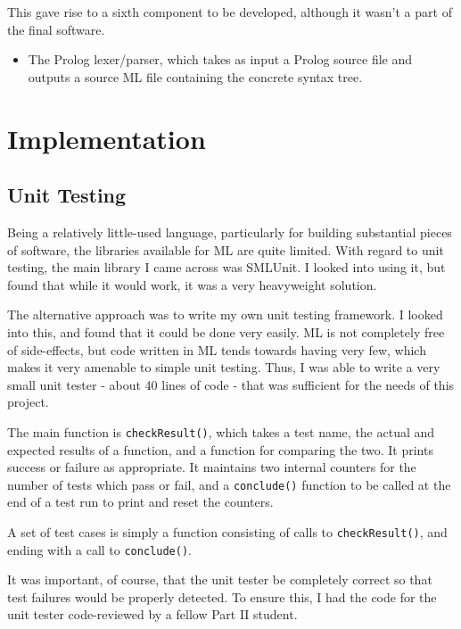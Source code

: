 \documentclass[12pt]{article}
\begin{document}
This gave rise to a sixth component to be developed, although it wasn't a part of the final software.

\begin{itemize}
\item The Prolog lexer/parser, which takes as input a Prolog source file and outputs a source ML file containing the concrete syntax tree.
\end{itemize}

\newpage

\section{Implementation}


\subsection{Unit Testing}

Being a relatively little-used language, particularly for building substantial pieces of software, the libraries available for ML are quite limited. 
With regard to unit testing, the main library I came across was SMLUnit. 
I looked into using it, but found that while it would work, it was a very heavyweight solution.

The alternative approach was to write my own unit testing framework. 
I looked into this, and found that it could be done very easily. 
ML is not completely free of side-effects, but code written in ML tends towards having very few, which makes it very amenable to simple unit testing. 
Thus, I was able to write a very small unit tester - about 40 lines of code - that was sufficient for the needs of this project.

The main function is \verb|checkResult()|, which takes a test name, the actual and expected results of a function, and a function for comparing the two. 
It prints success or failure as appropriate. 
It maintains two internal counters for the number of tests which pass or fail, and a \verb|conclude()| function to be called at the end of a test run to print and reset the counters.

A set of test cases is simply a function consisting of calls to \verb|checkResult()|, and ending with a call to \verb|conclude()|.

It was important, of course, that the unit tester be completely correct so that test failures would be properly detected. 
To ensure this, I had the code for the unit tester code-reviewed by a fellow Part II student.
\end{document}

